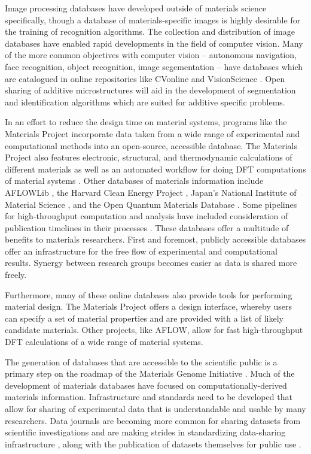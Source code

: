 Image processing databases have developed outside of materials science specifically, though a database of materials-specific images is highly desirable for the training of recognition algorithms. The collection and distribution of image databases have enabled rapid developments in the field of computer vision. Many of the more common objectives with computer vision -- autonomous navigation, face recognition, object recognition, image segementation -- have databases which are catalogued in online repositories like CVonline \cite{CVonline} and VisionScience \cite{VisionScience}. Open sharing of additive microstructures will aid in the development of segmentation and identification algorithms which are suited for additive specific problems. 

In an effort to reduce the design time on material systems, programs like the Materials Project incorporate data taken from a wide range of experimental and computational methods into an open-source, accessible database. The Materials Project also features electronic, structural, and thermodynamic calculations of different materials as well as an automated workflow for doing DFT computations of material systems \cite{Jain2011, Jain2013}. Other databases of materials information include AFLOWLib \cite{Curtarolo2012, Curtarolo2012a}, the Harvard Clean Energy Project \cite{Hachmann2011}, Japan's National Institute of Material Science \cite{NIMS}, and the Open Quantum Materials Database \cite{Saal2013}. Some pipelines for high-throughput computation and analysis have included consideration of publication timelines in their processes \cite{Foster2015}. These databases offer a multitude of benefits to materials researchers. First and foremost, publicly accessible databases offer an infrastructure for the free flow of experimental and computational results. Synergy between research groups becomes easier as data is shared more freely.

Furthermore, many of these online databases also provide tools for performing material design. The Materials Project offers a design interface, whereby users can specify a set of material properties and are provided with a list of likely candidate materials. Other projects, like AFLOW, allow for fast high-throughput DFT calculations of a wide range of material systems. 

The generation of databases that are accessible to the scientific public is a primary step on the roadmap of the Materials Genome Initiative \cite{DePablo2014}. Much of the development of materials databases have focused on computationally-derived materials information. Infrastructure and standards need to be developed that allow for sharing of experimental data that is understandable and usable by many researchers. Data journals are becoming more common for sharing datasets from scientific investigations and are making strides in standardizing data-sharing infrastructure \cite{Wilkinson2016}, along with the publication of datasets themselves for public use \cite{DeJong2015, Kim2017}. 

